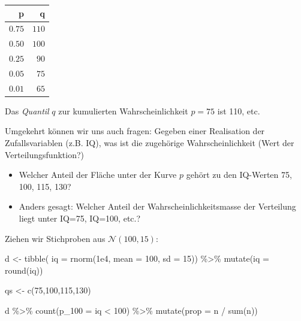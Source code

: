 \documentclass[
  a4paper,
  DIV=11]{scrreprt}
\newenvironment{Shaded}{\begin{snugshade}}{\end{snugshade}}
\newcommand{\AttributeTok}[1]{\textcolor[rgb]{0.40,0.45,0.13}{#1}}
\newcommand{\DecValTok}[1]{\textcolor[rgb]{0.68,0.00,0.00}{#1}}
\newcommand{\FloatTok}[1]{\textcolor[rgb]{0.68,0.00,0.00}{#1}}
\newcommand{\FunctionTok}[1]{\textcolor[rgb]{0.28,0.35,0.67}{#1}}
\newcommand{\NormalTok}[1]{\textcolor[rgb]{0.00,0.23,0.31}{#1}}
\newcommand{\OtherTok}[1]{\textcolor[rgb]{0.00,0.23,0.31}{#1}}
\newcommand{\SpecialCharTok}[1]{\textcolor[rgb]{0.37,0.37,0.37}{#1}}
\providecommand{\tightlist}{%
  \setlength{\itemsep}{0pt}\setlength{\parskip}{0pt}}\usepackage{longtable,booktabs,array}
\theoremstyle{definition}
\theoremstyle{remark}
\begin{document}
\begin{longtable}{rr}
\toprule
p & q \\ 
\midrule
$0.75$ & $110$ \\ 
$0.50$ & $100$ \\ 
$0.25$ & $90$ \\ 
$0.05$ & $75$ \\ 
$0.01$ & $65$ \\ 
\bottomrule
\end{longtable}

Das \emph{Quantil} \(q\) zur kumulierten Wahrscheinlichkeit \(p=75\) ist
110, etc.

Umgekehrt können wir uns auch fragen: Gegeben einer Realisation der
Zufallsvariablen (z.B. IQ), was ist die zugehörige Wahrscheinlichkeit
(Wert der Verteilungsfunktion?)

\begin{itemize}
\tightlist
\item
  Welcher Anteil der Fläche unter der Kurve \(p\) gehört zu den
  IQ-Werten 75, 100, 115, 130?
\item
  Anders gesagt: Welcher Anteil der Wahrscheinlichkeitsmasse der
  Verteilung liegt unter IQ=75, IQ=100, etc.?
\end{itemize}

Ziehen wir Stichproben aus \(\mathcal{N}(100,15)\):

\begin{Shaded}
\begin{Highlighting}[]
\NormalTok{d }\OtherTok{\textless{}{-}}
  \FunctionTok{tibble}\NormalTok{(}
    \AttributeTok{iq =} \FunctionTok{rnorm}\NormalTok{(}\FloatTok{1e4}\NormalTok{, }
               \AttributeTok{mean =} \DecValTok{100}\NormalTok{, }
               \AttributeTok{sd =} \DecValTok{15}\NormalTok{)) }\SpecialCharTok{\%\textgreater{}\%} 
  \FunctionTok{mutate}\NormalTok{(}\AttributeTok{iq =} \FunctionTok{round}\NormalTok{(iq))}

\NormalTok{qs }\OtherTok{\textless{}{-}} \FunctionTok{c}\NormalTok{(}\DecValTok{75}\NormalTok{,}\DecValTok{100}\NormalTok{,}\DecValTok{115}\NormalTok{,}\DecValTok{130}\NormalTok{)}

\NormalTok{d }\SpecialCharTok{\%\textgreater{}\%} 
  \FunctionTok{count}\NormalTok{(}\AttributeTok{p\_100 =}\NormalTok{ iq }\SpecialCharTok{\textless{}} \DecValTok{100}\NormalTok{) }\SpecialCharTok{\%\textgreater{}\%} 
  \FunctionTok{mutate}\NormalTok{(}\AttributeTok{prop =}\NormalTok{ n }\SpecialCharTok{/} \FunctionTok{sum}\NormalTok{(n)) }
\end{Highlighting}
\end{Shaded}
\end{document}
